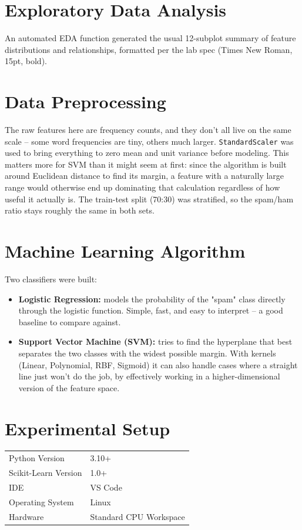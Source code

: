\documentclass[12pt,a4paper]{article}
\begin{document}
\section{Exploratory Data Analysis}
An automated EDA function generated the usual 12-subplot summary of feature distributions and relationships, formatted per the lab spec (Times New Roman, 15pt, bold).

\section{Data Preprocessing}
The raw features here are frequency counts, and they don't all live on the same scale -- some word frequencies are tiny, others much larger. \texttt{StandardScaler} was used to bring everything to zero mean and unit variance before modeling. This matters more for SVM than it might seem at first: since the algorithm is built around Euclidean distance to find its margin, a feature with a naturally large range would otherwise end up dominating that calculation regardless of how useful it actually is. The train-test split (70:30) was stratified, so the spam/ham ratio stays roughly the same in both sets.

\section{Machine Learning Algorithm}
Two classifiers were built:
\begin{itemize}
    \item \textbf{Logistic Regression:} models the probability of the "spam" class directly through the logistic function. Simple, fast, and easy to interpret -- a good baseline to compare against.
    \item \textbf{Support Vector Machine (SVM):} tries to find the hyperplane that best separates the two classes with the widest possible margin. With kernels (Linear, Polynomial, RBF, Sigmoid) it can also handle cases where a straight line just won't do the job, by effectively working in a higher-dimensional version of the feature space.
\end{itemize}

\section{Experimental Setup}
\begin{tabular}{ll}
\toprule
Python Version & 3.10+ \\
Scikit-Learn Version & 1.0+ \\
IDE & VS Code \\
Operating System & Linux \\
Hardware & Standard CPU Workspace \\
\bottomrule
\end{tabular}
\end{document}
